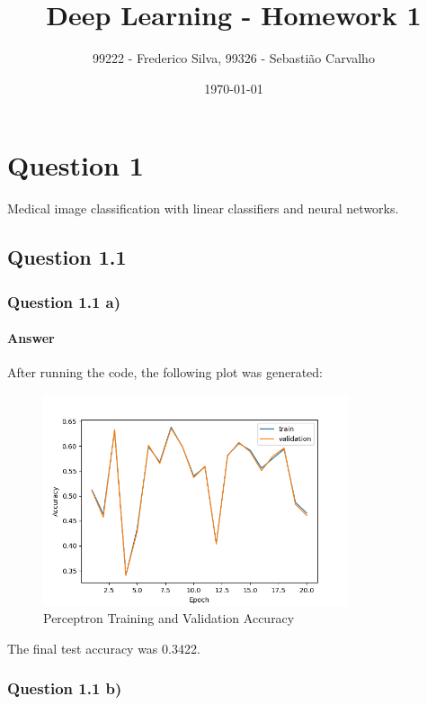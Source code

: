 \documentclass{article}
\title{Deep Learning - Homework 1}
\author{99222 - Frederico Silva, 99326 - Sebastião Carvalho}
\date{\today}
\begin{document}
\maketitle

\tableofcontents

\section{Question 1}

Medical image classification with linear classifiers and neural networks.

\subsection{Question 1.1}

\subsubsection{Question 1.1 a)}

\paragraph{Answer} After running the code, the following plot was generated:
\begin{figure}[H]
    \centering
    \includegraphics[width=0.8\textwidth]{"plots/1_1_a.png"}
    \caption{Perceptron Training and Validation Accuracy}
    \label{1.1.a Plot}
\end{figure}

The final test accuracy was 0.3422.

\subsubsection{Question 1.1 b)}
\end{document}
